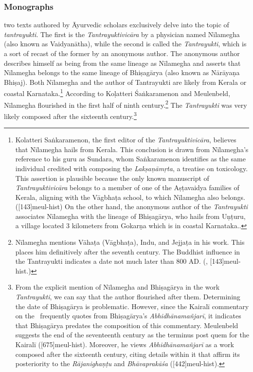 \subsubsection{Monographs}
two texts authored by Āyurvedic scholars exclusively delve into the topic of 
\emph{tantrayukti}. The first is the \emph{Tantrayuktivicāra} by a physician 
named Nīlamegha (also known as Vaidyanātha), while the second is called the 
\emph{Tantrayukti}, which is a sort of recast of the former by an anonymous 
author. The anonymous author describes himself as being from the same lineage 
as 
Nīlamegha and asserts that Nīlamegha belongs to the same lineage of Bhiṣagārya 
(also known as Nārāyaṇa Bhiṣaj). Both Nīlamegha and the author of Tantrayukti 
are 
likely from Kerala or coastal Karnataka.\footnote{Kolatteri Saṅkaramenon, 
	the first editor of the \emph{Tantrayuktivicāra}, believes that Nīlamegha hails 
from Kerala. This conclusion is drawn from Nīlamegha's reference to his guru as 
Sundara, whom Saṅkaramenon identifies as the same individual credited with 
composing the \emph{Lakṣaṇāmṛta}, a treatise on toxicology. This assertion is 
plausible because the only known manuscript of \emph{Tantrayuktivicāra} 
belongs to a member of one of the Aṣṭavaidya families of Kerala, aligning with the 
Vāgbhaṭa school, to which Nīlamegha also 
belongs.([143]{meul-hist}) 
On the other hand, the anonymous author of the \emph{Tantrayukti} associates 
Nīlamegha with the lineage of Bhiṣagārya, who hails from Uṇṭuru, a village 
located 
3 kilometers from Gokarṇa which is in coastal 
Karnataka.\parencite[30]{nara-1949}.}
According to Koḷatteri Śaṅkaramenon and Meulenbeld, Nīlamegha flourished in 
the first half of ninth century.\footnote{Nīlamegha mentions Vāhaṭa (Vāgbhaṭa), 
Indu, and Jejjaṭa in his work.
	 This places him definitively after the seventh century. The Buddhist influence 
in the Tantrayukti indicates a date not much later than 800 AD. 
(\cite[]{muth-1976}, [143]{meul-hist}.)} 
The \emph{Tantrayukti} was very likely composed after the sixteenth 
century.\footnote{From 
	the explicit mention of Nīlamegha and Bhiṣagārya in the work 
\emph{Tantrayukti}, we can say that the author flourished after them. 
Determining 
the date of Bhiṣagārya is problematic. However, since the Kairalī commentary on 
the \AHS\ frequently quotes from Bhiṣagārya's \emph{Abhidhānamañjarī}, it 
indicates that Bhiṣagārya predates the composition of this commentary. 
Meulenbeld suggests the end of the seventeenth century as the terminus post 
quem for the Kairalī ([675]{meul-hist}). Moreover, he views 
\emph{Abhidhānamañjarī} as a work composed after the sixteenth century, 
citing 
details within it that affirm its posteriority to the \emph{Rājanighaṇṭu} and 
\emph{Bhāvaprakāśa} ([442]{meul-hist}).} 

